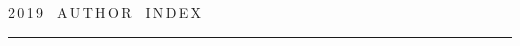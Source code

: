

\def\leftfootline{\small{\textbf{\thepage}


\hfill СИСТЕМЫ И СРЕДСТВА ИНФОРМАТИКИ\ \ \ выпуск~29\ \ \ №~4\ \ \ 2019}


}%


 \def\rightfootline{\small{СИСТЕМЫ И СРЕДСТВА ИНФОРМАТИКИ\ \ \ выпуск~29\ \ \


№~4\ \ \ 2019


 \hfill \textbf{\thepage}}}


 \label{end\stat}





\newpage





\def\stat{cont-e}


{%




\raggedleft\Large \bf%


2\,0\,1\,9\ \ A\,U\,T\,H\,O\,R\ \ I\,N\,D\,E\,X \vskip 17pt


 \hrule


 \par




 }





\label{st\stat}

















\def\leftkol{\ } %


\def\rightkol{\ } %















